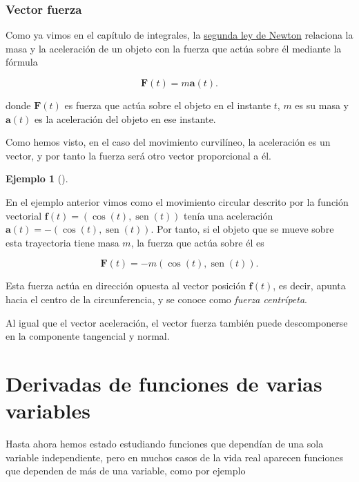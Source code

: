 \documentclass[
  a4paper,
]{scrreport}
\theoremstyle{definition}
\newtheorem{example}{Ejemplo}[chapter]
\theoremstyle{plain}
\theoremstyle{definition}
\theoremstyle{definition}
\theoremstyle{plain}
\theoremstyle{plain}
\theoremstyle{remark}
\begin{document}
\subsection{Vector fuerza}\label{vector-fuerza}

Como ya vimos en el capítulo de integrales, la
\href{https://es.wikipedia.org/wiki/Leyes_de_Newton\#Segunda_ley_de_Newton_o_ley_fundamental_de_la_din\%C3\%A1mica}{segunda
ley de Newton} relaciona la masa y la aceleración de un objeto con la
fuerza que actúa sobre él mediante la fórmula

\[
\mathbf{F}(t) = m\mathbf{a}(t).
\]

donde \(\mathbf{F}(t)\) es fuerza que actúa sobre el objeto en el
instante \(t\), \(m\) es su masa y \(\mathbf{a}(t)\) es la aceleración
del objeto en ese instante.

Como hemos visto, en el caso del movimiento curvilíneo, la aceleración
es un vector, y por tanto la fuerza será otro vector proporcional a él.

\begin{example}[]\protect\hypertarget{exm-fuerza-centrípeta}{}\label{exm-fuerza-centrípeta}

En el ejemplo anterior vimos como el movimiento circular descrito por la
función vectorial \(\mathbf{f}(t) = (\cos(t),\operatorname{sen}(t))\)
tenía una aceleración
\(\mathbf{a}(t) = -(\cos(t), \operatorname{sen}(t))\). Por tanto, si el
objeto que se mueve sobre esta trayectoria tiene masa \(m\), la fuerza
que actúa sobre él es

\[
\mathbf{F}(t) = -m(\cos(t), \operatorname{sen}(t)).
\]

Esta fuerza actúa en dirección opuesta al vector posición
\(\mathbf{f}(t)\), es decir, apunta hacia el centro de la
circunferencia, y se conoce como \emph{fuerza centrípeta}.

\end{example}

Al igual que el vector aceleración, el vector fuerza también puede
descomponerse en la componente tangencial y normal.


\chapter{Derivadas de funciones de varias
variables}\label{derivadas-de-funciones-de-varias-variables}

Hasta ahora hemos estado estudiando funciones que dependían de una sola
variable independiente, pero en muchos casos de la vida real aparecen
funciones que dependen de más de una variable, como por ejemplo
\end{document}
